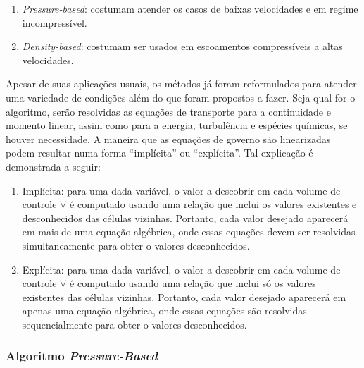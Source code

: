 \begin{enumerate}
    \item \textit{Pressure-based}: costumam atender os casos de baixas velocidades e em regime incompressível.
    \item \textit{Density-based}: costumam ser usados em escoamentos compressíveis a altas velocidades.
\end{enumerate}


Apesar de suas aplicações usuais, os métodos já foram reformulados para atender uma variedade de condições além do que foram propostos a fazer. Seja qual for o algoritmo, serão resolvidas as equações de transporte para a continuidade e momento linear, assim como para a energia, turbulência e espécies químicas, se houver necessidade. A maneira que as equações de governo são linearizadas podem resultar numa forma “implícita” ou “explícita”. Tal explicação é demonstrada a seguir:

\begin{enumerate}
    \item Implícita: para uma dada variável, o valor a descobrir em cada volume de controle \(\forall\) é computado usando uma relação que inclui os valores existentes e desconhecidos das células vizinhas. Portanto, cada valor desejado aparecerá em mais de uma equação algébrica, onde essas equações devem ser resolvidas simultaneamente para obter o valores desconhecidos.
    \item Explícita: para uma dada variável, o valor a descobrir em cada volume de controle \(\forall\) é computado usando uma relação que inclui só os valores existentes das células vizinhas. Portanto, cada valor desejado aparecerá em apenas uma equação algébrica, onde essas equações são resolvidas sequencialmente para obter o valores desconhecidos. 
\end{enumerate}

\subsubsection{Algoritmo \textit{Pressure-Based}}

